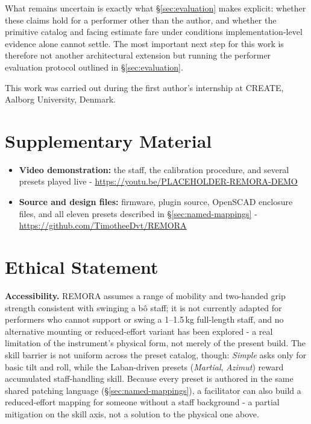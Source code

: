 \documentclass[sigconf,nonacm]{acmart}
\newcommand{\preset}[1]{\textit{#1}}
\begin{document}
What remains uncertain is exactly what \S\ref{sec:evaluation} makes explicit: whether these claims hold for a
performer other than the author, and whether the primitive catalog and facing estimate fare under
conditions implementation-level evidence alone cannot settle. The most important next step for this
work is therefore not another architectural extension but running the performer evaluation protocol
outlined in \S\ref{sec:evaluation}.

\begin{acks}
This work was carried out during the first author's internship at CREATE, Aalborg University,
Denmark.
\end{acks}

\section{Supplementary Material}
\begin{itemize}
  \item \textbf{Video demonstration:} the staff, the calibration procedure, and several presets
  played live - \url{https://youtu.be/PLACEHOLDER-REMORA-DEMO}
  \item \textbf{Source and design files:} firmware, plugin source, OpenSCAD enclosure files, and all
  eleven presets described in \S\ref{sec:named-mappings} -
  \url{https://github.com/TimotheeDvt/REMORA}
\end{itemize}

\section{Ethical Statement}
\textbf{Accessibility.} REMORA assumes a range of mobility and two-handed grip strength consistent
with swinging a b\^o staff; it is not currently adapted for performers who cannot support or swing a
1--1.5\,kg full-length staff, and no alternative mounting or reduced-effort variant has been
explored - a real limitation of the instrument's physical form, not merely of the present build.
The skill barrier is not uniform across the preset catalog, though: \preset{Simple} asks only for basic
tilt and roll, while the Laban-driven presets (\preset{Martial}, \preset{Azimut}) reward accumulated
staff-handling skill. Because every preset is authored in the same shared patching language
(\S\ref{sec:named-mappings}), a facilitator can also build a reduced-effort mapping for someone
without a staff background - a partial mitigation on the skill axis, not a solution to the physical
one above.
\end{document}
